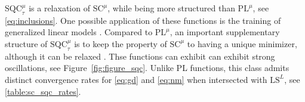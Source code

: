 \documentclass{article}
\newcommand{\jh}[1]{{\color{red} #1}}
\def\pl{{\text{PL}^\mu}}
\newcommand{\sqc}{\text{SQC}_{\tau}^{\mu}}
\newcommand{\ls}{\text{LS}^{L}}
\newcommand{\strongconv}{\text{SC}^{\mu}}
\theoremstyle{plain}
\theoremstyle{definition}
\theoremstyle{remark}
\begin{document}
$\sqc$ is a relaxation of $\strongconv$, while being more structured than $\pl$, see \eqref{eq:inclusions}. One possible application of these functions is the training of generalized linear models \cite[Section 3]{wang2023continuized}. Compared to $\pl$, an important supplementary structure of $\sqc$ is to keep the property of $\strongconv$ to having a unique minimizer, although it can be relaxed \cite{guptanesterov,hermant2025continuized}. Thse functions can exhibit can exhibit strong oscillations, see Figure~\ref{fig:figure_sqc}. Unlike PL functions, this class admits distinct convergence rates for \eqref{eq:gd} and \eqref{eq:nm} when intersected with $\ls$, see \cref{table:sc_sqc_rates}.

\end{document}

